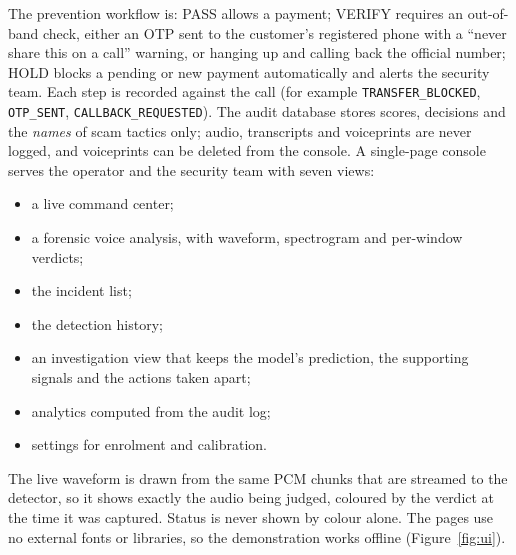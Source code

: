 \documentclass[10pt,a4paper,twocolumn]{article}
\begin{document}
The prevention workflow is: PASS allows a payment; VERIFY requires an out-of-band check, either an OTP sent to the customer's registered phone with a ``never share this on a call'' warning, or hanging up and calling back the official number; HOLD blocks a pending or new payment automatically and alerts the security team. Each step is recorded against the call (for example \texttt{TRANSFER\_BLOCKED}, \texttt{OTP\_SENT}, \texttt{CALLBACK\_REQUESTED}). The audit database stores scores, decisions and the \emph{names} of scam tactics only; audio, transcripts and voiceprints are never logged, and voiceprints can be deleted from the console. A single-page console serves the operator and the security team with seven views:
\begin{itemize}\setlength\itemsep{0pt}
\item a live command center;
\item a forensic voice analysis, with waveform, spectrogram and per-window verdicts;
\item the incident list;
\item the detection history;
\item an investigation view that keeps the model's prediction, the supporting signals and the actions taken apart;
\item analytics computed from the audit log;
\item settings for enrolment and calibration.
\end{itemize}
The live waveform is drawn from the same PCM chunks that are streamed to the detector, so it shows exactly the audio being judged, coloured by the verdict at the time it was captured. Status is never shown by colour alone. The pages use no external fonts or libraries, so the demonstration works offline (Figure~\ref{fig:ui}).
\end{document}
